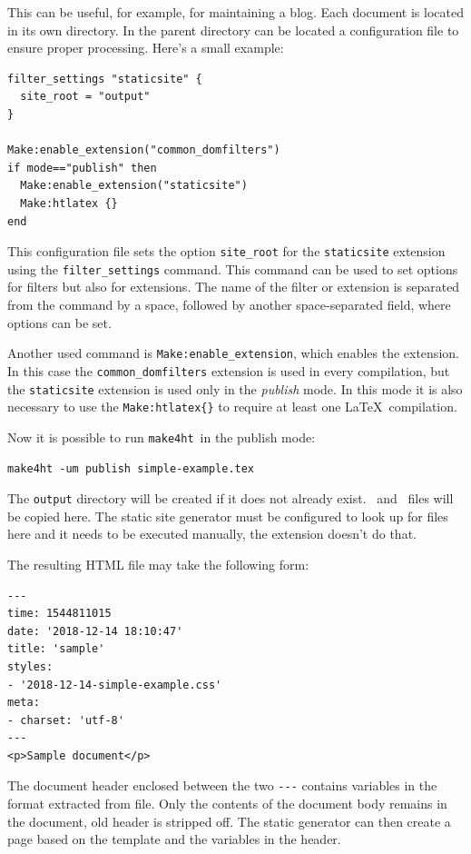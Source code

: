 \documentclass{ltugproc}
\newcommand\term[1]{\textit{#1}}
\newcommand\command[1]{\texttt{#1}}
\newcommand\makefourht{\command{make4ht}}
\newcommand\mkextension[1]{\texttt{#1}}
\begin{document}
This can be useful, for example, for maintaining a blog.
Each document is located in its own directory. In the parent directory
can be located a configuration file to ensure proper processing. Here's a small
example: 

\begin{verbatim}
filter_settings "staticsite" {
  site_root = "output" 
}

Make:enable_extension("common_domfilters")
if mode=="publish" then
  Make:enable_extension("staticsite")
  Make:htlatex {}
end

\end{verbatim}

This configuration file sets the option \verb|site_root| for the \mkextension{staticsite} extension using the \verb|filter_settings| command. 
This command can be used to set options for filters but also for extensions.
The name of the filter or extension is separated from the command by a space,
followed by another space-separated field, where options can be set.

Another used command is \verb|Make:enable_extension|, which enables the
extension. In this case the \verb|common_domfilters| extension is used in every
compilation, but the \mkextension{staticsite} extension is used only in the  \term{publish}
mode. In this mode it is also necessary to use the \verb|Make:htlatex{}| to
require at least one \LaTeX\ compilation.

Now it is possible to run \makefourht\ in the publish mode:


\begin{verbatim}
make4ht -um publish simple-example.tex
\end{verbatim}

The \texttt{output} directory will be created if it does not already exist. \HTML\ and \CSS\ files will be copied here. The static site generator must be configured to look up for files here and it needs to be executed manually, the extension doesn't do that. 

The resulting HTML file may take the following form: 


\begin{verbatim}
---
time: 1544811015
date: '2018-12-14 18:10:47'
title: 'sample'
styles:
- '2018-12-14-simple-example.css'
meta:
- charset: 'utf-8'
---
<p>Sample document</p>
\end{verbatim}

The document header enclosed between the two \verb|---| contains variables in the 
format extracted from   \HTML file. Only the contents of the document body
remains in the document, old header is stripped off. The
static generator can then create a page based on the template and the variables
in the   header.
\end{document}
